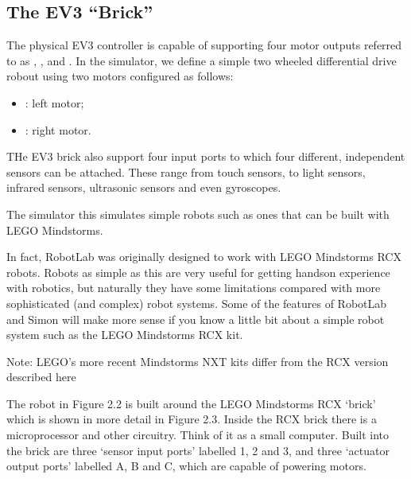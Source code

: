 \documentclass[letterpaper,10pt,english]{sphinxmanual}
\begin{document}
\subsection{The EV3 “Brick”}
\label{\detokenize{content/00_SOFTWARE_GUIDE/Section_00_02_ev3devsim_simulator_overview:The-EV3-_u201cBrick_u201d}}
The physical EV3 controller is capable of supporting four motor outputs referred to as , ,  and . In the simulator, we define a simple two wheeled differential drive robout using two motors configured as follows:
\begin{itemize}
\item {} 
: left motor;

\item {} 
: right motor.

\end{itemize}

THe EV3 brick also support four input ports to which four different, independent sensors can be attached. These range from touch sensors, to light sensors, infrared sensors, ultrasonic sensors and even gyroscopes.

The  simulator this simulates simple robots such as ones that can be built with LEGO Mindstorms.


In fact, RobotLab was originally designed to work with LEGO Mindstorms RCX robots. Robots as simple as this are very useful for getting hands\sphinxhyphen{}on experience with robotics, but naturally they have some limitations compared with more sophisticated (and complex) robot systems. Some of the features of RobotLab and Simon will make more sense if you know a little bit about a simple robot system such as the LEGO Mindstorms RCX kit.





Note: LEGO’s more recent Mindstorms NXT kits differ from the RCX version described here





The robot in Figure 2.2 is built around the LEGO Mindstorms RCX ‘brick’ which is shown in more detail in Figure 2.3. Inside the RCX brick there is a microprocessor and other circuitry. Think of it as a small computer. Built into the brick are three ‘sensor input ports’ labelled 1, 2 and 3, and three ‘actuator output ports’ labelled A, B and C, which are capable of powering motors.
\end{document}
